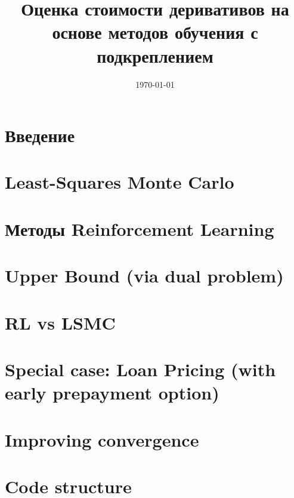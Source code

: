 \documentclass[8pt]{article}
\renewcommand{\|}{\ensuremath{\hspace{0.1cm} | \hspace{0.1cm}}}
\begin{document}
    \title{Оценка стоимости деривативов на основе методов обучения с подкреплением}

    \date{\today}

    \maketitle

    

    \tableofcontents

    \section{Введение}
        

    \section{Least-Squares Monte Carlo \cite{LSMC}}
        

    \section{Методы Reinforcement Learning}
        

    \section{Upper Bound (via dual problem)}
        

    \section{RL vs LSMC}
        

    \appendix
    \section{Special case: Loan Pricing (with early prepayment option)}
        

    \section{Improving convergence}
        

    \section{Code structure}
        

    \nocite{*}
    \printbibliography
\end{document}
